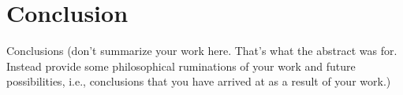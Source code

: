 \section{Conclusion}
\label{sec:conc}

Conclusions (don't summarize your work here. That's what the abstract
was for. Instead provide some philosophical ruminations of your work and
future possibilities, i.e., conclusions that you have arrived at as a
result of your work.)
